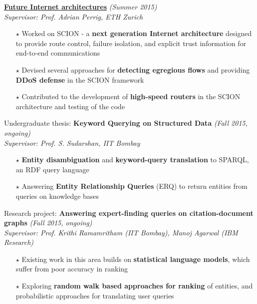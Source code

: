 \documentclass[a4paper]{article}
\begin{document}
\textbf{\href{http://www.scion-architecture.net}{Future Internet architectures}} \hfill{\sl \small (Summer 2015)}\\
\emph{Supervisor: Prof. Adrian Perrig, ETH Zurich}\\
\vspace{-17pt}
\begin{itemize}[itemsep = -0.5 mm, leftmargin=*]
 \item[$\star$] Worked on SCION - a \textbf{next generation Internet architecture} designed to provide route control, failure isolation, and explicit trust information for end-to-end communications
 \item[$\star$] Devised several approaches for \textbf{detecting egregious flows} and providing \textbf{DDoS defense} in the SCION framework
 \item[$\star$] Contributed to the development of \textbf{high-speed routers} in the SCION architecture and testing of the code
\end{itemize}
Undergraduate thesis: \textbf{Keyword Querying on Structured Data}
\hfill{\sl \small (Fall 2015, ongoing)}\\
\emph{Supervisor: Prof. S. Sudarshan, IIT Bombay}\\
\vspace{-17pt}
\begin{itemize}[itemsep = -0.5 mm, leftmargin=*]
 \item[$\star$] \textbf{Entity disambiguation} and \textbf{keyword-query translation} to SPARQL, an RDF query language
 \item[$\star$] Answering \textbf{Entity Relationship Queries} (ERQ) to return entities from queries on knowledge bases
\end{itemize}
Research project: \textbf{Answering expert-finding queries on citation-document graphs}
\hfill{\sl \small (Fall 2015, ongoing)}\\
\emph{Supervisor: Prof. Krithi Ramamritham (IIT Bombay), Manoj Agarwal (IBM Research)}\\
\vspace{-17pt}
\begin{itemize}[itemsep = -0.5 mm, leftmargin=*]
 \item[$\star$] Existing work in this area builds on \textbf{statistical language models}, which suffer from poor accuracy in ranking
 \item[$\star$] Exploring \textbf{random walk based approaches for ranking} of entities, and probabilistic approaches for translating user queries
\end{itemize}
\end{document}
